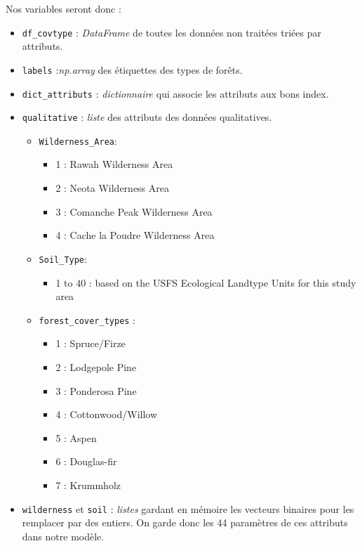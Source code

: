 \documentclass[12pt,a4paper]{article}
\numberwithin{equation}{section}
\newcommand{\wilderness}{\texttt{Wilderness\_Area}}
\newcommand{\soil}{\texttt{Soil\_Type}}
\begin{document}
	Nos variables seront donc : 
	\begin{itemize}
	 	\item \verb!df_covtype! : \textit{DataFrame} de toutes les données non traitées triées par attributs. 
	 	\item \verb!labels! :\textit{np.array} des étiquettes des types de forêts.
	 	\item \verb!dict_attributs! : \textit{dictionnaire} qui associe les attributs aux bons index. 
	 	\item \verb!qualitative! : \textit{liste} des attributs des données qualitatives.
	 	
	 	\begin{itemize}
	 		\item \wilderness :
	 	
		 		\begin{itemize}
		 				\item 1 : Rawah Wilderness Area
		 				\item 2 : Neota Wilderness Area
		 				\item 3 : Comanche Peak Wilderness Area
		 				\item 4 : Cache la Poudre Wilderness Area
		 		\end{itemize}
		 	
		 	\item \soil :
		 	\begin{itemize}
		 		\item 1 to 40 : based on the USFS Ecological Landtype Units for this study area
		 	\end{itemize}
	 	
	 		\item \verb!forest_cover_types! : 
	 			\begin{itemize}
	 					\item 1 : Spruce/Firze
 						\item 2 : Lodgepole Pine
 						\item 3 : Ponderosa Pine
 						\item 4 : Cottonwood/Willow
 						\item 5 : Aspen
 						\item 6 : Douglas-fir
 						\item 7 : Krummholz
		\end{itemize}
	\end{itemize}
	
	\item \verb!wilderness! et \verb!soil! : \textit{listes} gardant en mémoire les vecteurs binaires pour les remplacer par des entiers. On garde donc les 44 paramètres de ces attributs dans notre modèle.
	
	\end{itemize}
	
\end{document}
